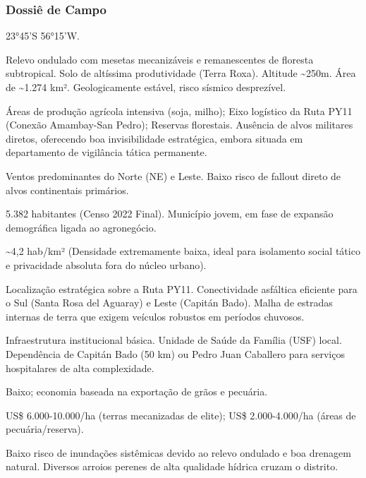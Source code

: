 \subsubsection{Dossiê de Campo}
\begin{description}[style=nextline,leftmargin=0.5cm,font=\bfseries]
\item[Coordenadas]  23°45'S 56°15'W.
\item[Topografia]  Relevo ondulado com mesetas mecanizáveis e remanescentes de floresta subtropical. Solo de altíssima produtividade (Terra Roxa). Altitude \textasciitilde 250m. Área de \textasciitilde 1.274 km². Geologicamente estável, risco sísmico desprezível.
\item[Alvos Estratégicos]  Áreas de produção agrícola intensiva (soja, milho); Eixo logístico da Ruta PY11 (Conexão Amambay-San Pedro); Reservas florestais. Ausência de alvos militares diretos, oferecendo boa invisibilidade estratégica, embora situada em departamento de vigilância tática permanente.
\item[Fallout]  Ventos predominantes do Norte (NE) e Leste. Baixo risco de fallout direto de alvos continentais primários.
\item[População]  5.382 habitantes (Censo 2022 Final). Município jovem, em fase de expansão demográfica ligada ao agronegócio.
\item[Densidade]  \textasciitilde 4,2 hab/\allowbreak km² (Densidade extremamente baixa, ideal para isolamento social tático e privacidade absoluta fora do núcleo urbano).
\item[Vias de Acesso]  Localização estratégica sobre a Ruta PY11. Conectividade asfáltica eficiente para o Sul (Santa Rosa del Aguaray) e Leste (Capitán Bado). Malha de estradas internas de terra que exigem veículos robustos em períodos chuvosos.
\item[Serviços]  Infraestrutura institucional básica. Unidade de Saúde da Família (USF) local. Dependência de Capitán Bado (50 km) ou Pedro Juan Caballero para serviços hospitalares de alta complexidade.
\item[Custo de Vida]  Baixo; economia baseada na exportação de grãos e pecuária.
\item[Preço da Terra]  US\$ 6.000-10.000/\allowbreak ha (terras mecanizadas de elite); US\$ 2.000-4.000/\allowbreak ha (áreas de pecuária/\allowbreak reserva).
\item[Hidrologia]  Baixo risco de inundações sistêmicas devido ao relevo ondulado e boa drenagem natural. Diversos arroios perenes de alta qualidade hídrica cruzam o distrito.

\end{description}
